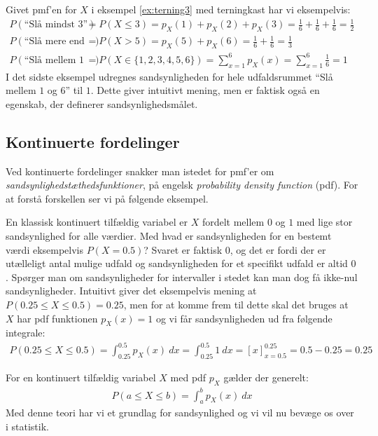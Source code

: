 \begin{example}
Givet pmf'en for $X$ i eksempel \ref{ex:terning3} med terningkast har vi eksempelvis:
\begin{align*}
P(\text{``Slå mindst 3''}) &= P(X \leq 3) = p_X(1) + p_X(2) + p_X(3) = \frac{1}{6} + \frac{1}{6} + \frac{1}{6} = \frac{1}{2} \\
P(\text{``Slå mere end 4''}) &= P(X > 5) = p_X(5) + p_X(6) = \frac{1}{6} + \frac{1}{6} = \frac{1}{3} \\ 
P(\text{``Slå mellem 1 og 6''}) &= P(X \in \{1,2,3,4,5,6\}) = \sum_{x = 1}^6 p_X(x) =  \sum_{x = 1}^6 \frac{1}{6} = 1
\end{align*}
I det sidste eksempel udregnes sandsynligheden for hele udfaldsrummet ``Slå mellem $1$ og $6$'' til $1$. Dette giver intuitivt mening, men er faktisk også en egenskab, der definerer sandsynlighedsmålet. 
\end{example}
%
\subsection{Kontinuerte fordelinger}
Ved kontinuerte fordelinger snakker man istedet for pmf'er om \textit{sandsynlighedstæthedsfunktioner}, på engelsk \textit{probability density function} (pdf). For at forstå forskellen ser vi på følgende eksempel.
\begin{example} \label{ex:unif1}
En klassisk kontinuert tilfældig variabel er $X$ fordelt mellem $0$ og $1$ med lige stor sandsynlighed for alle værdier. Med hvad er  sandsynligheden for en bestemt værdi eksempelvis $P(X = 0.5)$? Svaret er faktisk $0$, og det er fordi der er utælleligt antal mulige udfald og sandsynligheden for et specifikt udfald er altid $0$. Spørger man om sandsynligheder for intervaller i stedet kan man dog få ikke-nul sandsynligheder. Intuitivt giver det eksempelvis mening at $P(0.25 \leq X \leq 0.5) = 0.25$, men for at komme frem til dette skal det bruges at $X$ har pdf funktionen $p_X(x) = 1$ og vi får sandsynligheden ud fra følgende integrale:
\begin{align*}
P(0.25 \leq X \leq 0.5) = \int_{0.25}^{0.5} p_X(x) \ dx = \int_{0.25}^{0.5} 1 \ dx = \left[x \right]_{x = 0.5}^{0.25} = 0.5 - 0.25 = 0.25
\end{align*}
\end{example} 
For en kontinuert tilfældig variabel $X$ med pdf $p_X$ gælder der generelt:
\begin{align*}
P(a \leq X \leq b) = \int_a^b p_X(x) \ dx
\end{align*}
Med denne teori har vi et grundlag for sandsynlighed og vi vil nu bevæge os over i statistik. 